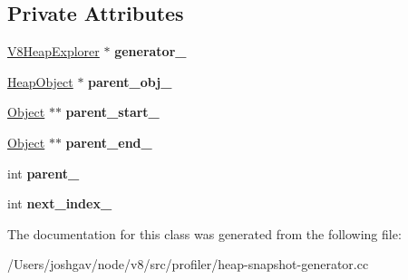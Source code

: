 \subsection*{Private Attributes}
\begin{DoxyCompactItemize}
\item 
\hyperlink{classv8_1_1internal_1_1_v8_heap_explorer}{V8\+Heap\+Explorer} $\ast$ {\bfseries generator\+\_\+}\hypertarget{classv8_1_1internal_1_1_indexed_references_extractor_a83991ee83011b460b6d9a07eec259bbf}{}\label{classv8_1_1internal_1_1_indexed_references_extractor_a83991ee83011b460b6d9a07eec259bbf}

\item 
\hyperlink{classv8_1_1internal_1_1_heap_object}{Heap\+Object} $\ast$ {\bfseries parent\+\_\+obj\+\_\+}\hypertarget{classv8_1_1internal_1_1_indexed_references_extractor_a4c36c7f0c35e3e641cd2db4d4d933573}{}\label{classv8_1_1internal_1_1_indexed_references_extractor_a4c36c7f0c35e3e641cd2db4d4d933573}

\item 
\hyperlink{classv8_1_1internal_1_1_object}{Object} $\ast$$\ast$ {\bfseries parent\+\_\+start\+\_\+}\hypertarget{classv8_1_1internal_1_1_indexed_references_extractor_a86f322c4b9cb8bf407c9a6ff5d507201}{}\label{classv8_1_1internal_1_1_indexed_references_extractor_a86f322c4b9cb8bf407c9a6ff5d507201}

\item 
\hyperlink{classv8_1_1internal_1_1_object}{Object} $\ast$$\ast$ {\bfseries parent\+\_\+end\+\_\+}\hypertarget{classv8_1_1internal_1_1_indexed_references_extractor_a94558965b98ca2e3adfbcfe2cfb52205}{}\label{classv8_1_1internal_1_1_indexed_references_extractor_a94558965b98ca2e3adfbcfe2cfb52205}

\item 
int {\bfseries parent\+\_\+}\hypertarget{classv8_1_1internal_1_1_indexed_references_extractor_a1910fbe288d27a73429f26e5b25e7e95}{}\label{classv8_1_1internal_1_1_indexed_references_extractor_a1910fbe288d27a73429f26e5b25e7e95}

\item 
int {\bfseries next\+\_\+index\+\_\+}\hypertarget{classv8_1_1internal_1_1_indexed_references_extractor_aa65147c339770c20836edafa8daf9384}{}\label{classv8_1_1internal_1_1_indexed_references_extractor_aa65147c339770c20836edafa8daf9384}

\end{DoxyCompactItemize}


The documentation for this class was generated from the following file\+:\begin{DoxyCompactItemize}
\item 
/\+Users/joshgav/node/v8/src/profiler/heap-\/snapshot-\/generator.\+cc\end{DoxyCompactItemize}
